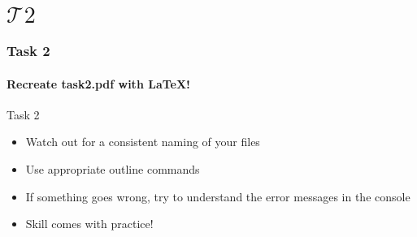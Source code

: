 \section{$\mathcal{T}2$} 
\begin{frame}
\frametitle{Task 2}
\framesubtitle{Recreate task2.pdf with \LaTeX !} 

\begin{block}{Task 2}
\begin{itemize}
  \item Watch out for a consistent naming of your files
  \item Use appropriate outline commands
  \item If something goes wrong, try to understand the error messages in the console
  \item Skill comes with practice!
\end{itemize}
\end{block}
\end{frame}